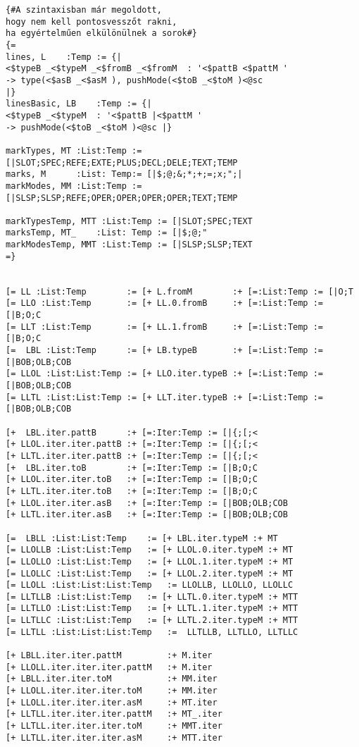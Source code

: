 \begin{verbatim}
{#A szintaxisban már megoldott, 
hogy nem kell pontosvesszőt rakni, 
ha egyértelműen elkülönülnek a sorok#}
{=
lines, L    :Temp := {|
<$typeB _<$typeM _<$fromB _<$fromM  : '<$pattB <$pattM ' 
-> type(<$asB _<$asM ), pushMode(<$toB _<$toM )<@sc 
|}
linesBasic, LB    :Temp := {|
<$typeB _<$typeM  : '<$pattB |<$pattM ' 
-> pushMode(<$toB _<$toM )<@sc |}

markTypes, MT :List:Temp := [|SLOT;SPEC;REFE;EXTE;PLUS;DECL;DELE;TEXT;TEMP
marks, M	  :List: Temp:= [|$;@;&;*;+;=;x;";|
markModes, MM :List:Temp := [|SLSP;SLSP;REFE;OPER;OPER;OPER;OPER;TEXT;TEMP

markTypesTemp, MTT :List:Temp := [|SLOT;SPEC;TEXT
marksTemp, MT_	  :List: Temp := [|$;@;"
markModesTemp, MMT :List:Temp := [|SLSP;SLSP;TEXT
=}


[= LL :List:Temp 		:= [+ L.fromM 		 :+ [=:List:Temp := [|O;T
[= LLO :List:Temp 		:= [+ LL.0.fromB 	 :+ [=:List:Temp := [|B;O;C
[= LLT :List:Temp 		:= [+ LL.1.fromB 	 :+ [=:List:Temp := [|B;O;C
[= 	LBL :List:Temp 		:= [+ LB.typeB  	 :+ [=:List:Temp := [|BOB;OLB;COB
[= LLOL :List:List:Temp := [+ LLO.iter.typeB :+ [=:List:Temp := [|BOB;OLB;COB
[= LLTL :List:List:Temp := [+ LLT.iter.typeB :+ [=:List:Temp := [|BOB;OLB;COB

[+ 	LBL.iter.pattB 		:+ [=:Iter:Temp := [|{;[;<
[+ LLOL.iter.iter.pattB	:+ [=:Iter:Temp := [|{;[;<
[+ LLTL.iter.iter.pattB	:+ [=:Iter:Temp := [|{;[;<
[+  LBL.iter.toB   		:+ [=:Iter:Temp := [|B;O;C    
[+ LLOL.iter.iter.toB  	:+ [=:Iter:Temp := [|B;O;C
[+ LLTL.iter.iter.toB  	:+ [=:Iter:Temp := [|B;O;C
[+ LLOL.iter.iter.asB  	:+ [=:Iter:Temp := [|BOB;OLB;COB
[+ LLTL.iter.iter.asB  	:+ [=:Iter:Temp := [|BOB;OLB;COB
							
[= 	LBLL :List:List:Temp 	:= [+ LBL.iter.typeM :+ MT
[= LLOLLB :List:List:Temp 	:= [+ LLOL.0.iter.typeM :+ MT
[= LLOLLO :List:List:Temp 	:= [+ LLOL.1.iter.typeM :+ MT
[= LLOLLC :List:List:Temp 	:= [+ LLOL.2.iter.typeM :+ MT
[= LLOLL :List:List:List:Temp 	:= LLOLLB, LLOLLO, LLOLLC
[= LLTLLB :List:List:Temp 	:= [+ LLTL.0.iter.typeM :+ MTT
[= LLTLLO :List:List:Temp 	:= [+ LLTL.1.iter.typeM :+ MTT
[= LLTLLC :List:List:Temp 	:= [+ LLTL.2.iter.typeM :+ MTT
[= LLTLL :List:List:List:Temp 	:=  LLTLLB, LLTLLO, LLTLLC

[+ LBLL.iter.iter.pattM   		:+ M.iter
[+ LLOLL.iter.iter.iter.pattM   :+ M.iter
[+ LBLL.iter.iter.toM     		:+ MM.iter
[+ LLOLL.iter.iter.iter.toM     :+ MM.iter
[+ LLOLL.iter.iter.iter.asM     :+ MT.iter
[+ LLTLL.iter.iter.iter.pattM   :+ MT_.iter
[+ LLTLL.iter.iter.iter.toM     :+ MMT.iter
[+ LLTLL.iter.iter.iter.asM     :+ MTT.iter


\end{verbatim}
